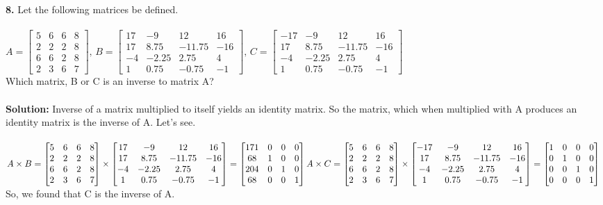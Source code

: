 \documentclass{article}
\begin{document}
\textbf{8. }Let the following matrices be defined.\\ \\
$A = 
\left[
\begin{matrix}
5&6&6&8\\
2&2&2&8\\
6&6&2&8\\
2&3&6&7
\end{matrix}
\right], \, B = 
\left[
\begin{matrix}
17&-9&12&16\\
17&8.75&-11.75&-16\\
-4&-2.25&2.75&4\\
1&0.75&-0.75&-1
\end{matrix}
\right], \, C = 
\left[
\begin{matrix}
-17&-9&12&16\\
17&8.75&-11.75&-16\\
-4&-2.25&2.75&4\\
1&0.75&-0.75&-1
\end{matrix}
\right] \, $\\
Which matrix, B or C is an inverse to matrix A?\\ \\
\textbf{Solution:} Inverse of a matrix multiplied to itself yields an identity matrix. So the matrix, which when multiplied with A produces an identity matrix is the inverse of A. Let's see.\\ \\
$A\times B = \left[
\begin{matrix}
5&6&6&8\\
2&2&2&8\\
6&6&2&8\\
2&3&6&7
\end{matrix}
\right] \times\left[
\begin{matrix}
17&-9&12&16\\
17&8.75&-11.75&-16\\
-4&-2.25&2.75&4\\
1&0.75&-0.75&-1
\end{matrix}
\right] = \left[
\begin{matrix}
171&0&0&0\\
68&1&0&0\\
204&0&1&0\\
68&0&0&1
\end{matrix}
\right]\\ \\ \\
A\times C = \left[
\begin{matrix}
5&6&6&8\\
2&2&2&8\\
6&6&2&8\\
2&3&6&7
\end{matrix}
\right] \times\left[
\begin{matrix}
-17&-9&12&16\\
17&8.75&-11.75&-16\\
-4&-2.25&2.75&4\\
1&0.75&-0.75&-1
\end{matrix}
\right] = \left[
\begin{matrix}
1&0&0&0\\
0&1&0&0\\
0&0&1&0\\
0&0&0&1
\end{matrix}
\right]\\$ \\
So, we found that C is the inverse of A.
\end{document}

